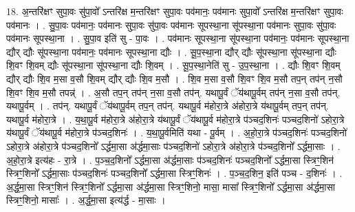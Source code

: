 \documentclass[17pt]{extarticle}
\begin{document}
18. अ॒न्तरि॑क्षꣳ सुपा॒वः सु॑पा॒वो᳚ ऽन्तरि॑क्ष म॒न्तरि॑क्षꣳ सुपा॒वः पव॑मानः॒ पव॑मानः सुपा॒वो᳚ ऽन्तरि॑क्ष म॒न्तरि॑क्षꣳ सुपा॒वः पव॑मानः । . सु॒पा॒वः पव॑मानः॒ पव॑मानः सुपा॒वः सु॑पा॒वः पव॑मानः सूपस्था॒ना सू॑पस्था॒ना पव॑मानः सुपा॒वः सु॑पा॒वः पव॑मानः सूपस्था॒ना । . सु॒पा॒व इति॑ सु - पा॒वः । . पव॑मानः सूपस्था॒ना सू॑पस्था॒ना पव॑मानः॒ पव॑मानः सूपस्था॒ना द्यौर् द्यौः सू॑पस्था॒ना पव॑मानः॒ पव॑मानः सूपस्था॒ना द्यौः । . सू॒प॒स्था॒ना द्यौर् द्यौः सू॑पस्था॒ना सू॑पस्था॒ना द्यौः शि॒वꣳ शि॒वम् द्यौः सू॑पस्था॒ना सू॑पस्था॒ना द्यौः शि॒वम् । . सू॒प॒स्था॒नेति॑ सु - उ॒प॒स्था॒ना । . द्यौः शि॒वꣳ शि॒वम् द्यौर् द्यौः शि॒व म॒सा व॒सौ शि॒वम् द्यौर् द्यौः शि॒व म॒सौ । . शि॒व म॒सा व॒सौ शि॒वꣳ शि॒व म॒सौ तप॒न् तप॑न् न॒सौ शि॒वꣳ शि॒व म॒सौ तपन्न्॑ । . अ॒सौ तप॒न् तप॑न् न॒सा व॒सौ तप॑न्. यथापू॒र्वं ॅय॑थापू॒र्वम् तप॑न् न॒सा व॒सौ तप॑न्. यथापू॒र्वम् । . तप॑न्. यथापू॒र्वं ॅय॑थापू॒र्वम् तप॒न् तप॑न्. यथापू॒र्व म॑होरा॒त्रे अ॑होरा॒त्रे य॑थापू॒र्वम् तप॒न् तप॑न्. यथापू॒र्व म॑होरा॒त्रे । . य॒था॒पू॒र्व म॑होरा॒त्रे अ॑होरा॒त्रे य॑थापू॒र्वं ॅय॑थापू॒र्व म॑होरा॒त्रे प॑ञ्चद॒शिनः॑ पञ्चद॒शिनो॑ ऽहोरा॒त्रे य॑थापू॒र्वं ॅय॑थापू॒र्व म॑होरा॒त्रे प॑ञ्चद॒शिनः॑ । . य॒था॒पू॒र्वमिति॑ यथा - पू॒र्वम् । . अ॒हो॒रा॒त्रे प॑ञ्चद॒शिनः॑ पञ्चद॒शिनो॑ ऽहोरा॒त्रे अ॑होरा॒त्रे प॑ञ्चद॒शिनो᳚ ऽर्द्धमा॒सा अ॑र्द्धमा॒साः प॑ञ्चद॒शिनो॑ ऽहोरा॒त्रे अ॑होरा॒त्रे प॑ञ्चद॒शिनो᳚ ऽर्द्धमा॒साः । . अ॒हो॒रा॒त्रे इत्य॑हः - रा॒त्रे । . प॒ञ्च॒द॒शिनो᳚ ऽर्द्धमा॒सा अ॑र्द्धमा॒साः प॑ञ्चद॒शिनः॑ पञ्चद॒शिनो᳚ ऽर्द्धमा॒सा स्त्रिꣳ॒॒शिन॑ स्त्रिꣳ॒॒शिनो᳚ ऽर्द्धमा॒साः प॑ञ्चद॒शिनः॑ पञ्चद॒शिनो᳚ ऽर्द्धमा॒सा स्त्रिꣳ॒॒शिनः॑ । . प॒ञ्च॒द॒शिन॒ इति॑ पञ्च - द॒शिनः॑ । . अ॒र्द्ध॒मा॒सा स्त्रिꣳ॒॒शिन॑ स्त्रिꣳ॒॒शिनो᳚ ऽर्द्धमा॒सा अ॑र्द्धमा॒सा स्त्रिꣳ॒॒शिनो॒ मासा॒ मासा᳚ स्त्रिꣳ॒॒शिनो᳚ ऽर्द्धमा॒सा अ॑र्द्धमा॒सा स्त्रिꣳ॒॒शिनो॒ मासाः᳚ । . अ॒र्द्ध॒मा॒सा इत्य॑र्द्ध - मा॒साः । \newline
\end{document}
